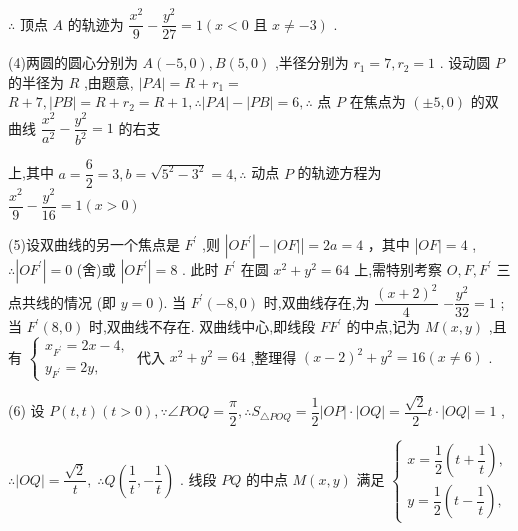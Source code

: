 $\therefore$ 顶点 $A$ 的轨迹为 $\dfrac{{x}^{2}}{9} - \dfrac{{y}^{2}}{27} = 1\left( {x < 0\text{ 且 }x \neq   - 3}\right)$ .

(4)两圆的圆心分别为 $A\left( {-5,0}\right) ,B\left( {5,0}\right)$ ,半径分别为 ${r}_{1} = 7,{r}_{2} = 1$ . 设动圆 $P$ 的半径为 $R$ ,由题意, $\left| {PA}\right|  = R + {r}_{1} =$  $R + 7,\left| {PB}\right|  = R + {r}_{2} = R + 1,\therefore \left| {PA}\right|  - \left| {PB}\right|  = 6,\therefore$ 点 $P$ 在焦点为 $\left( {\pm 5,0}\right)$ 的双曲线 $\dfrac{{x}^{2}}{{a}^{2}} - \dfrac{{y}^{2}}{{b}^{2}} = 1$ 的右支

上,其中 $a = \dfrac{6}{2} = 3,b = \sqrt{{5}^{2} - {3}^{2}} = 4,\therefore$ 动点 $P$ 的轨迹方程为 $\dfrac{{x}^{2}}{9} - \dfrac{{y}^{2}}{16} = 1\left( {x > 0}\right)$

(5)设双曲线的另一个焦点是 ${F}^{\prime }$ ,则 $\left| {O{F}^{\prime }}\right|  - \left| {OF}\right| \left| { = {2a} = 4\text{ ，其中 }}\right| {OF} \mid   = 4$ , $\therefore \left| {O{F}^{\prime }}\right|  = 0$ (舍)或 $\left| {O{F}^{\prime }}\right|  = 8$ . 此时 ${F}^{\prime }$ 在圆 ${x}^{2} + {y}^{2} = {64}$ 上,需特别考察 $O,F,{F}^{\prime }$ 三点共线的情况 (即 $y = 0$ ). 当 ${F}^{\prime }\left( {-8,0}\right)$ 时,双曲线存在,为 $\dfrac{{\left( x + 2\right) }^{2}}{4}$  $- \dfrac{{y}^{2}}{32} = 1$ ; 当 ${F}^{\prime }\left( {8,0}\right)$ 时,双曲线不存在. 双曲线中心,即线段 $F{F}^{\prime }$ 的中点,记为 $M\left( {x,y}\right)$ ,且有 $\left\{  \begin{array}{l} {x}_{{F}^{\prime }} = {2x} - 4, \\  {y}_{{F}^{\prime }} = {2y}, \end{array}\right.$ 代入 ${x}^{2} + {y}^{2} = {64}$ ,整理得 ${\left( x - 2\right) }^{2} + {y}^{2} = {16}\left( {x \neq  6}\right)$ .

(6) 设 $P\left( {t,t}\right) \left( {t > 0}\right) ,\because \angle {POQ} = \dfrac{\pi }{2},\therefore {S}_{\bigtriangleup {POQ}} = \dfrac{1}{2}\left| {OP}\right|  \cdot  \left| {OQ}\right|  = \dfrac{\sqrt{2}}{2}t \cdot  \left| {OQ}\right|  = 1$ ,

$\therefore \left| {OQ}\right|  = \dfrac{\sqrt{2}}{t},\;\therefore Q\left( {\dfrac{1}{t}, - \dfrac{1}{t}}\right)$ . 线段 ${PQ}$ 的中点 $M\left( {x,y}\right)$ 满足 $\left\{  \begin{array}{l} x = \dfrac{1}{2}\left( {t + \dfrac{1}{t}}\right) , \\  y = \dfrac{1}{2}\left( {t - \dfrac{1}{t}}\right) , \end{array}\right.$

